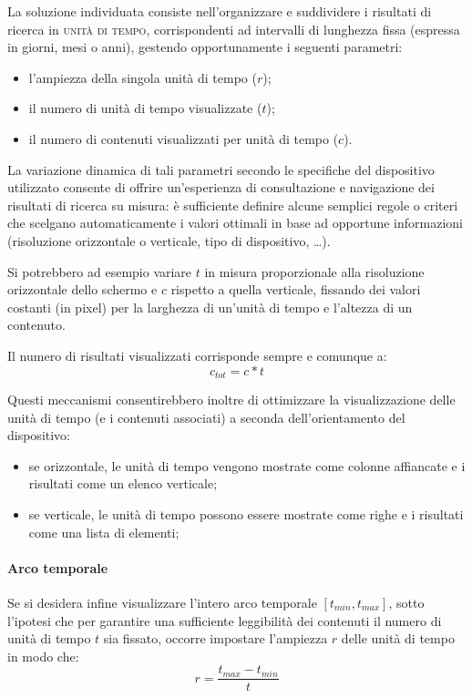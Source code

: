 La soluzione individuata consiste nell'organizzare e suddividere i risultati di ricerca in \textsc{unità di tempo}, corrispondenti ad intervalli di lunghezza fissa (espressa in giorni, mesi o anni), gestendo opportunamente i seguenti parametri:
\begin{itemize}
  \item l'ampiezza della singola unità di tempo ($r$);
  \item il numero di unità di tempo visualizzate ($t$);
  \item il numero di contenuti visualizzati per unità di tempo ($c$).
\end{itemize}

La variazione dinamica di tali parametri secondo le specifiche del dispositivo utilizzato consente di offrire un'esperienza di consultazione e navigazione dei risultati di ricerca su misura: è sufficiente definire alcune semplici regole o criteri che scelgano automaticamente i valori ottimali in base ad opportune informazioni (risoluzione orizzontale o verticale, tipo di dispositivo, \ldots).

Si potrebbero ad esempio variare $t$ in misura proporzionale alla risoluzione orizzontale dello schermo e $c$ rispetto a quella verticale, fissando dei valori costanti (in pixel) per la larghezza di un'unità di tempo e l'altezza di un contenuto.

Il numero di risultati visualizzati corrisponde sempre e comunque a:\begin{equation}
c_{tot} = c * t
\end{equation}

Questi meccanismi consentirebbero inoltre di ottimizzare la visualizzazione delle unità di tempo (e i contenuti associati) a seconda dell'orientamento del dispositivo:
\begin{itemize}
  \item se orizzontale, le unità di tempo vengono mostrate come colonne affiancate e i risultati come un elenco verticale;
  \item se verticale, le unità di tempo possono essere mostrate come righe e i risultati come una lista di elementi;
\end{itemize}

\paragraph{Arco temporale}
Se si desidera infine visualizzare l'intero arco temporale $[t_{min}, t_{max}]$, sotto l'ipotesi che per garantire una sufficiente leggibilità dei contenuti il numero di unità di tempo $t$ sia fissato, occorre impostare l'ampiezza $r$ delle unità di tempo in modo che:
\begin{equation}
 r = \frac{t_{max}-t_{min}}{t}
\end{equation}

